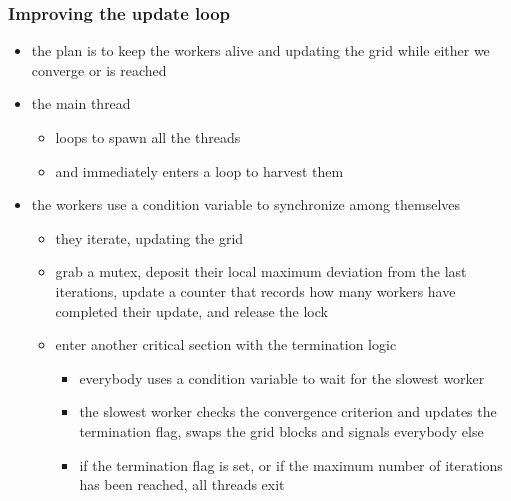 \begin{frame}[fragile]
%
  \frametitle{Improving the update loop}
%
  \begin{itemize}
%
  \item the plan is to keep the workers alive and updating the grid while either we converge or
     is reached
  \item the main thread
    \begin{itemize}
    \item loops to spawn all the threads
    \item and immediately enters a loop to harvest them
    \end{itemize}
%
  \item the workers use a condition variable to synchronize among themselves
    \begin{itemize}
    \item they iterate, updating the grid
    \item grab a mutex, deposit their local maximum deviation from the last iterations, update
      a counter that records how many workers have completed their update, and release the lock
    \item enter another critical section with the termination logic
      \begin{itemize}
      \item everybody uses a condition variable to wait for the slowest worker
      \item the slowest worker checks the convergence criterion and updates the termination
        flag, swaps the grid blocks and signals everybody else
      \item if the termination flag is set, or if the maximum number of iterations has been
        reached, all threads exit
      \end{itemize}
    \end{itemize}
%
  \end{itemize}
%
\end{frame}

